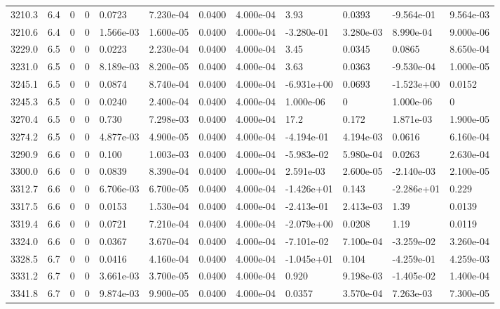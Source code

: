 \documentclass[preview]{standalone}
\begin{document}
{{{{{{{{\begin{tabular}{L{1.2cm}C{1.2cm} C{0.3cm}C{0.5cm} C{1.4cm}C{1.4cm} C{1.4cm}C{1.4cm} C{1.6cm}C{1.6cm} C{1.6cm}C{1.6cm}}
  3210.3  &   6.4  & 0     &  0 &  0.0723  & 7.230e-04  &  0.0400&   4.000e-04& 3.93 & 0.0393   &  -9.564e-01 & 9.564e-03  \\ 
  3210.6  &   6.4  & 0     &  0 &  1.566e-03  & 1.600e-05  &  0.0400&   4.000e-04& -3.280e-01 & 3.280e-03   &  8.990e-04 & 9.000e-06  \\ 
  3229.0  &   6.5  & 0     &  0 &  0.0223  & 2.230e-04  &  0.0400&   4.000e-04& 3.45 & 0.0345   &  0.0865 & 8.650e-04  \\ 
  3231.0  &   6.5  & 0     &  0 &  8.189e-03  & 8.200e-05  &  0.0400&   4.000e-04& 3.63 & 0.0363   &  -9.530e-04 & 1.000e-05  \\ 
  3245.1  &   6.5  & 0     &  0 &  0.0874  & 8.740e-04  &  0.0400&   4.000e-04& -6.931e+00 & 0.0693   &  -1.523e+00 & 0.0152  \\ 
  3245.3  &   6.5  & 0     &  0 &  0.0240  & 2.400e-04  &  0.0400&   4.000e-04& 1.000e-06 & 0   &  1.000e-06 & 0  \\ 
  3270.4  &   6.5  & 0     &  0 &  0.730  & 7.298e-03  &  0.0400&   4.000e-04& 17.2 & 0.172   &  1.871e-03 & 1.900e-05  \\ 
  3274.2  &   6.5  & 0     &  0 &  4.877e-03  & 4.900e-05  &  0.0400&   4.000e-04& -4.194e-01 & 4.194e-03   &  0.0616 & 6.160e-04  \\ 
  3290.9  &   6.6  & 0     &  0 &  0.100  & 1.003e-03  &  0.0400&   4.000e-04& -5.983e-02 & 5.980e-04   &  0.0263 & 2.630e-04  \\ 
  3300.0  &   6.6  & 0     &  0 &  0.0839  & 8.390e-04  &  0.0400&   4.000e-04& 2.591e-03 & 2.600e-05   &  -2.140e-03 & 2.100e-05  \\ 
  3312.7  &   6.6  & 0     &  0 &  6.706e-03  & 6.700e-05  &  0.0400&   4.000e-04& -1.426e+01 & 0.143   &  -2.286e+01 & 0.229  \\ 
  3317.5  &   6.6  & 0     &  0 &  0.0153  & 1.530e-04  &  0.0400&   4.000e-04& -2.413e-01 & 2.413e-03   &  1.39 & 0.0139  \\ 
  3319.4  &   6.6  & 0     &  0 &  0.0721  & 7.210e-04  &  0.0400&   4.000e-04& -2.079e+00 & 0.0208   &  1.19 & 0.0119  \\ 
  3324.0  &   6.6  & 0     &  0 &  0.0367  & 3.670e-04  &  0.0400&   4.000e-04& -7.101e-02 & 7.100e-04   &  -3.259e-02 & 3.260e-04  \\ 
  3328.5  &   6.7  & 0     &  0 &  0.0416  & 4.160e-04  &  0.0400&   4.000e-04& -1.045e+01 & 0.104   &  -4.259e-01 & 4.259e-03  \\ 
  3331.2  &   6.7  & 0     &  0 &  3.661e-03  & 3.700e-05  &  0.0400&   4.000e-04& 0.920 & 9.198e-03   &  -1.405e-02 & 1.400e-04  \\ 
  3341.8  &   6.7  & 0     &  0 &  9.874e-03  & 9.900e-05  &  0.0400&   4.000e-04& 0.0357 & 3.570e-04   &  7.263e-03 & 7.300e-05  \\ 
\hline 
\end{tabular} 

}}}}}}}}
\end{document}
